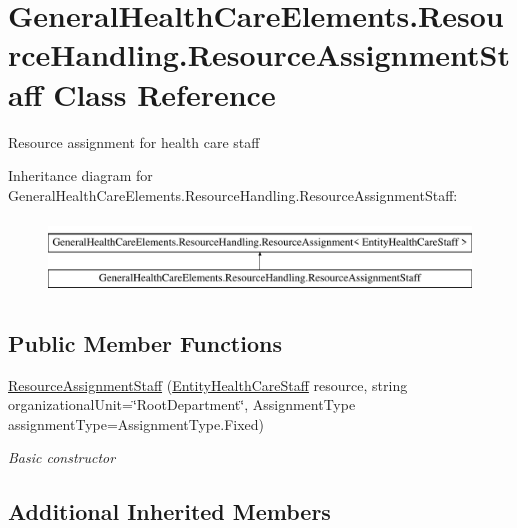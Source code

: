 \hypertarget{class_general_health_care_elements_1_1_resource_handling_1_1_resource_assignment_staff}{}\section{General\+Health\+Care\+Elements.\+Resource\+Handling.\+Resource\+Assignment\+Staff Class Reference}
\label{class_general_health_care_elements_1_1_resource_handling_1_1_resource_assignment_staff}


Resource assignment for health care staff  


Inheritance diagram for General\+Health\+Care\+Elements.\+Resource\+Handling.\+Resource\+Assignment\+Staff\+:\begin{figure}[H]
\begin{center}
\leavevmode
\includegraphics[height=2.000000cm]{class_general_health_care_elements_1_1_resource_handling_1_1_resource_assignment_staff}
\end{center}
\end{figure}
\subsection*{Public Member Functions}
\begin{DoxyCompactItemize}
\item 
\hyperlink{class_general_health_care_elements_1_1_resource_handling_1_1_resource_assignment_staff_a59ba241b8db4353c615707ed306128c9}{Resource\+Assignment\+Staff} (\hyperlink{class_general_health_care_elements_1_1_entities_1_1_entity_health_care_staff}{Entity\+Health\+Care\+Staff} resource, string organizational\+Unit=\char`\"{}Root\+Department\char`\"{}, Assignment\+Type assignment\+Type=Assignment\+Type.\+Fixed)
\begin{DoxyCompactList}\small\item\em Basic constructor \end{DoxyCompactList}\end{DoxyCompactItemize}
\subsection*{Additional Inherited Members}


